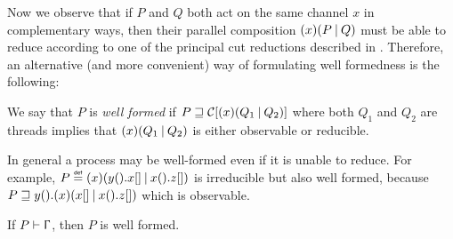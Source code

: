 Now we observe that if $P$ and $Q$ both act on the same channel $x$ in
complementary ways, then their parallel composition $(x)(P\mathbin| Q)$ must be able
to reduce according to one of the principal cut reductions described in
. Therefore, an alternative (and more convenient) way of
formulating well formedness is the following:

\begin{definition}
    \label{def:well-formedness}
    We say that $P$ is \emph{well formed} if $P \sqsupseteq
    \mathcal{C}[(x)(Q_1\mathbin| Q_2)]$ where both $Q_1$ and $Q_2$ are threads
    implies that $(x)(Q_1\mathbin| Q_2)$ is either observable or reducible.
\end{definition}

In general a process may be well-formed even if it is unable to reduce. For
example, $P \stackrel{\smash{\textsf{\upshape\tiny def}}}= (x)(y().x[]\mathbin|x().z[])$ is irreducible
but also well formed, because $P \sqsupseteq
y().(x)(x[]\mathbin|x().z[])$ which is observable.

\begin{theorem}
    \label{thm:type-safety}
    If $\wtp{P}\Context$, then $P$ is well formed.
\end{theorem}


